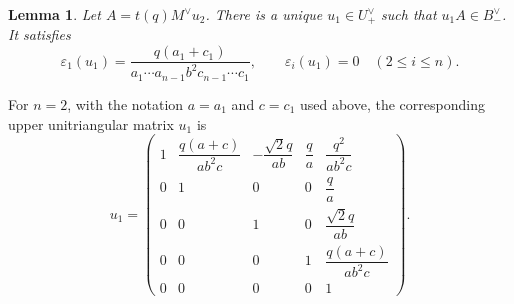 \documentclass{article}
\newtheorem{lemma}[thm]{Lemma}
\begin{document}
\begin{lemma}\label{lem:triangular-elimination}
Let \(A=t(q)M^\vee u_2\). There is a unique \(u_1\in U_+^\vee\) such that \(u_1A\in B_-^\vee\). It satisfies
\[
\varepsilon_1(u_1)
=
\frac{q(a_1+c_1)}{a_1\cdots a_{n-1}b^2c_{n-1}\cdots c_1},
\qquad
\varepsilon_i(u_1)=0\quad(2\le i\le n).
\]
\end{lemma}

For \(n=2\), with the notation \(a=a_1\) and \(c=c_1\) used above, the corresponding upper unitriangular matrix \(u_1\) is
\[
u_1=
\begin{pmatrix}
1&\dfrac{q(a+c)}{ab^2c}&-\dfrac{\sqrt2q}{ab}&\dfrac{q}{a}&\dfrac{q^2}{ab^2c}\\[1.1em]
0&1&0&0&\dfrac{q}{a}\\[1.1em]
0&0&1&0&\dfrac{\sqrt2q}{ab}\\[1.1em]
0&0&0&1&\dfrac{q(a+c)}{ab^2c}\\[1.1em]
0&0&0&0&1
\end{pmatrix}.
\]
\end{document}
